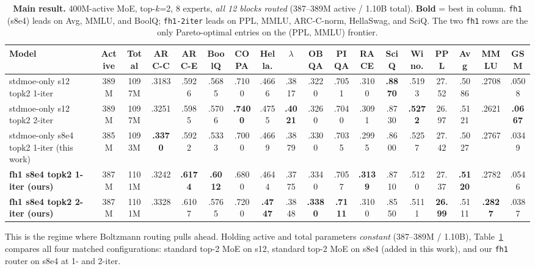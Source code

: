 \documentclass[oneside]{article}
\begin{document}
\begin{table}[t]
\centering
\caption{\textbf{Main result.} 400M-active MoE, top-$k$=2, 8 experts, \emph{all 12 blocks routed} (387--389M active / 1.10B total). \textbf{Bold} = best in column. \texttt{fh1} (s8e4) leads on Avg, MMLU, and BoolQ; \texttt{fh1-2iter} leads on PPL, MMLU, ARC-C-norm, HellaSwag, and SciQ. The two \texttt{fh1} rows are the only Pareto-optimal entries on the (PPL, MMLU) frontier.}
\label{tab:main}
\begin{adjustbox}{max width=\textwidth}
\begin{tabular}{l|cc|cccccccccccc|c|cc}
\toprule
\textbf{Model} & \textbf{Active} & \textbf{Total} & \textbf{ARC-C} & \textbf{ARC-E} & \textbf{BoolQ} & \textbf{COPA} & \textbf{Hella.} & \textbf{$\lambda$} & \textbf{OBQA} & \textbf{PIQA} & \textbf{RACE} & \textbf{SciQ} & \textbf{Wino.} & \textbf{PPL} & \textbf{Avg} & \textbf{MMLU} & \textbf{GSM} \\
\midrule
stdmoe-only s12 topk2 1-iter           & 389M & 1097M & .3183 & .5926 & .5685 & .7100 & .4666 & .3817 & .3220 & .7051 & .3100 & \textbf{.8870} & .5193 & 27.52 & .5086 & .2708 & .0508 \\
stdmoe-only s12 topk2 2-iter           & 389M & 1097M & .3251 & .5985 & .5706 & \textbf{.7400} & .4755 & \textbf{.4021} & .3260 & .7040 & .3091 & .8730 & \textbf{.5272} & 26.97 & .5121 & .2621 & \textbf{.0667} \\
\midrule
stdmoe-only s8e4 topk2 1-iter (this work) & 385M & 1093M & \textbf{.3370} & .5922 & .5333 & .7000 & .4669 & .3879 & .3300 & .7035 & .2995 & .8600 & .5257 & 27.42 & .5027 & .2767 & .0349 \\
\midrule
\textbf{fh1 s8e4 topk2 1-iter (ours)}      & 387M & 1101M & .3242 & \textbf{.6174} & \textbf{.6012} & .6800 & .4644 & .3775 & .3340 & .7057 & \textbf{.3139} & .8710 & .5120 & 27.37 & \textbf{.5120} & .2782 & .0546 \\
\textbf{fh1 s8e4 topk2 2-iter (ours)}      & 387M & 1101M & .3328 & .6107 & .5765 & .7200 & \textbf{.4747} & .3848 & \textbf{.3380} & \textbf{.7111} & .3100 & .8550 & .5111 & \textbf{26.99} & .5111 & \textbf{.2827} & .0387 \\
\bottomrule
\end{tabular}
\end{adjustbox}
\end{table}

This is the regime where Boltzmann routing pulls ahead. Holding active and total parameters \emph{constant} (387--389M / 1.10B), Table~\ref{tab:main} compares all four matched configurations: standard top-2 MoE on s12, standard top-2 MoE on s8e4 (added in this work), and our \texttt{fh1} router on s8e4 at 1- and 2-iter.
\end{document}

